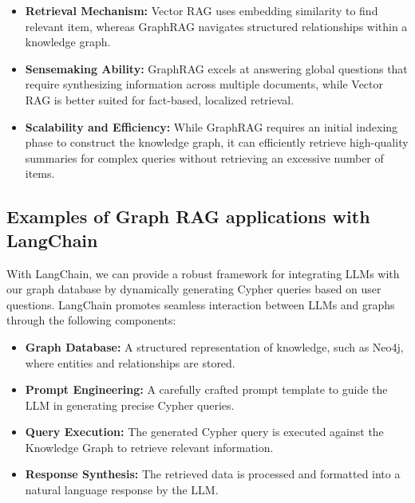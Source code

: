 \begin{itemize}
    \item 	\textbf{Retrieval Mechanism:} Vector RAG uses embedding similarity to find relevant item, whereas GraphRAG navigates structured relationships within a knowledge graph.
    \item 	\textbf{Sensemaking Ability:} GraphRAG excels at answering global questions that require synthesizing information across multiple documents, while Vector RAG is better suited for fact-based, localized retrieval.
    \item 	\textbf{Scalability and Efficiency:} While GraphRAG requires an initial indexing phase to construct the knowledge graph, it can efficiently retrieve high-quality summaries for complex queries without retrieving an excessive number of items.
\end{itemize}


\subsection{Examples of Graph RAG  applications with LangChain}

With LangChain, we can provide a robust framework for integrating LLMs with our graph database by dynamically generating Cypher queries based on user questions. LangChain promotes seamless interaction between LLMs and graphs through the following components:

\begin{itemize}
    \item \textbf{Graph Database:} A structured representation of knowledge, such as Neo4j, where entities and relationships are stored.
    \item \textbf{Prompt Engineering:} A carefully crafted prompt template to guide the LLM in generating precise Cypher queries.
    \item \textbf{Query Execution:} The generated Cypher query is executed against the Knowledge Graph to retrieve relevant information.
    \item \textbf{Response Synthesis:} The retrieved data is processed and formatted into a natural language response by the LLM.
\end{itemize}

